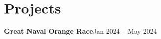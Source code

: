 \section{Projects}
    \resumeSubHeadingListStart

      \resumeProjectHeading
        {\textbf{Great Naval Orange Race}}{Jan 2024 -- May 2024}
        \resumeItemListStart
        \resumeItemListEnd



    \resumeSubHeadingListEnd
